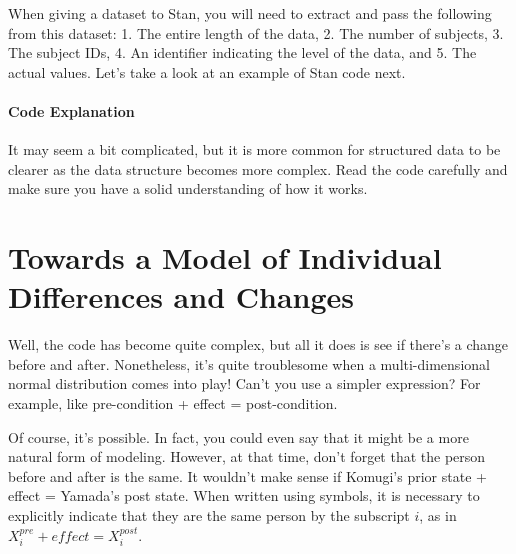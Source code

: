 \documentclass{ltjsbook}
\begin{document}
When giving a dataset to Stan, you will need to extract and pass the following from this dataset: 1. The entire length of the data, 2. The number of subjects, 3. The subject IDs, 4. An identifier indicating the level of the data, and 5. The actual values.
Let's take a look at an example of Stan code next.


\paragraph{Code Explanation}


It may seem a bit complicated, but it is more common for structured data to be clearer as the data structure becomes more complex. Read the code carefully and make sure you have a solid understanding of how it works.

\section{Towards a Model of Individual Differences and Changes}
Well, the code has become quite complex, but all it does is see if there's a change before and after. Nonetheless, it's quite troublesome when a multi-dimensional normal distribution comes into play!
Can't you use a simpler expression? For example, like pre-condition + effect = post-condition.

Of course, it's possible. In fact, you could even say that it might be a more natural form of modeling. However, at that time, don't forget that the person before and after is the same. It wouldn't make sense if Komugi's prior state + effect = Yamada's post state.
When written using symbols, it is necessary to explicitly indicate that they are the same person by the subscript $i$, as in $X_i^{pre} + effect = X_i^{post}$.
\end{document}
